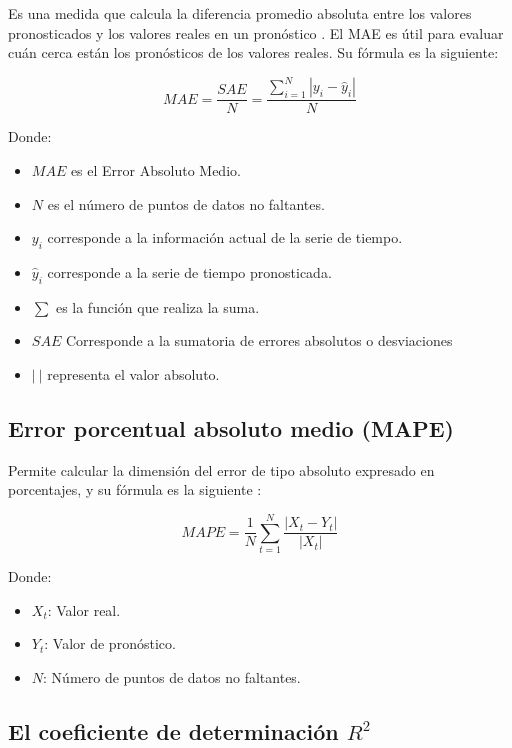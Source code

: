 \vspace{1\baselineskip}
Es una medida que calcula la diferencia promedio absoluta entre los valores
pronosticados y los valores reales en un pronóstico
\cite{chang2023comparacion}. El MAE es útil para evaluar cuán cerca están los
pronósticos de los valores reales. Su fórmula es la siguiente:

\[
  MAE = \frac{SAE}{N} = \frac{\sum_{i=1}^{N} |y_i - \hat{y}_i|}{N}
\]

Donde:

\begin{itemize}
  \item $MAE$ es el Error Absoluto Medio.
  \item $N$ es el número de puntos de datos no faltantes.
  \item $y_i$ corresponde a la información actual de la serie de tiempo.
  \item $\hat{y}_i$ corresponde a la serie de tiempo pronosticada.
  \item $\sum$ es la función que realiza la suma.
  \item $SAE$  Corresponde a la sumatoria de errores absolutos o desviaciones
  \item $|\ |$ representa el valor absoluto.
\end{itemize}

\subsection{Error porcentual absoluto medio (MAPE)}

Permite calcular la dimensión del error de tipo absoluto expresado en
porcentajes, y su fórmula es la siguiente \cite{chang2023comparacion}:

\[
  MAPE = \frac{1}{N} \sum_{t=1}^{N} \frac{|X_t - Y_t|}{|X_t|}
\]

Donde:

\begin{itemize}
  \item $X_t$: Valor real.
  \item $Y_t$: Valor de pronóstico.
  \item $N$: Número de puntos de datos no faltantes.
\end{itemize}

\subsection{El coeficiente de determinación \( R^2 \)}

